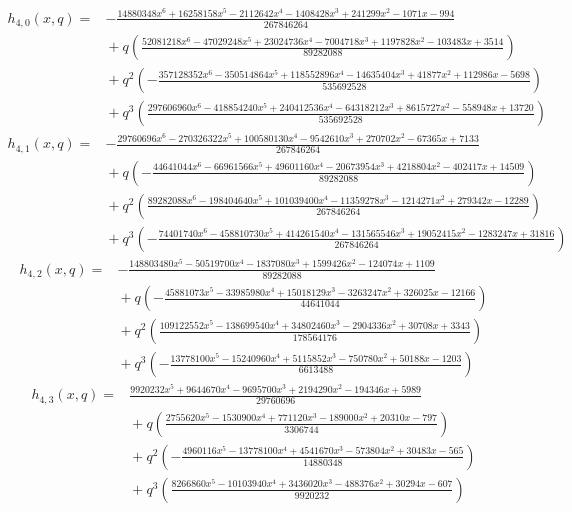 \documentclass[11pt]{article}
\begin{document}
\[
\begin{split}
h_{4,0}(x,q)={}&- \frac{14880348 x^{6} + 16258158 x^{5} - 2112642 x^{4} - 1408428 x^{3} + 241299 x^{2} - 1071 x - 994}{267846264}\\
&{}+q\left(\frac{52081218 x^{6} - 47029248 x^{5} + 23024736 x^{4} - 7004718 x^{3} + 1197828 x^{2} - 103483 x + 3514}{89282088}\right)\\
&{}+q^{2}\left(- \frac{357128352 x^{6} - 350514864 x^{5} + 118552896 x^{4} - 14635404 x^{3} + 41877 x^{2} + 112986 x - 5698}{535692528}\right)\\
&{}+q^{3}\left(\frac{297606960 x^{6} - 418854240 x^{5} + 240412536 x^{4} - 64318212 x^{3} + 8615727 x^{2} - 558948 x + 13720}{535692528}\right)
\end{split}
\tag{ANP24}
\]
\[
\begin{split}
h_{4,1}(x,q)={}&- \frac{29760696 x^{6} - 270326322 x^{5} + 100580130 x^{4} - 9542610 x^{3} + 270702 x^{2} - 67365 x + 7133}{267846264}\\
&{}+q\left(- \frac{44641044 x^{6} - 66961566 x^{5} + 49601160 x^{4} - 20673954 x^{3} + 4218804 x^{2} - 402417 x + 14509}{89282088}\right)\\
&{}+q^{2}\left(\frac{89282088 x^{6} - 198404640 x^{5} + 101039400 x^{4} - 11359278 x^{3} - 1214271 x^{2} + 279342 x - 12289}{267846264}\right)\\
&{}+q^{3}\left(- \frac{74401740 x^{6} - 458810730 x^{5} + 414261540 x^{4} - 131565546 x^{3} + 19052415 x^{2} - 1283247 x + 31816}{267846264}\right)
\end{split}
\tag{ANP25}
\]
\[
\begin{split}
h_{4,2}(x,q)={}&- \frac{148803480 x^{5} - 50519700 x^{4} - 1837080 x^{3} + 1599426 x^{2} - 124074 x + 1109}{89282088}\\
&{}+q\left(- \frac{45881073 x^{5} - 33985980 x^{4} + 15018129 x^{3} - 3263247 x^{2} + 326025 x - 12166}{44641044}\right)\\
&{}+q^{2}\left(\frac{109122552 x^{5} - 138699540 x^{4} + 34802460 x^{3} - 2904336 x^{2} + 30708 x + 3343}{178564176}\right)\\
&{}+q^{3}\left(- \frac{13778100 x^{5} - 15240960 x^{4} + 5115852 x^{3} - 750780 x^{2} + 50188 x - 1203}{6613488}\right)
\end{split}
\tag{ANP26}
\]
\[
\begin{split}
h_{4,3}(x,q)={}&\frac{9920232 x^{5} + 9644670 x^{4} - 9695700 x^{3} + 2194290 x^{2} - 194346 x + 5989}{29760696}\\
&{}+q\left(\frac{2755620 x^{5} - 1530900 x^{4} + 771120 x^{3} - 189000 x^{2} + 20310 x - 797}{3306744}\right)\\
&{}+q^{2}\left(- \frac{4960116 x^{5} - 13778100 x^{4} + 4541670 x^{3} - 573804 x^{2} + 30483 x - 565}{14880348}\right)\\
&{}+q^{3}\left(\frac{8266860 x^{5} - 10103940 x^{4} + 3436020 x^{3} - 488376 x^{2} + 30294 x - 607}{9920232}\right)
\end{split}
\tag{ANP27}
\]
\end{document}
